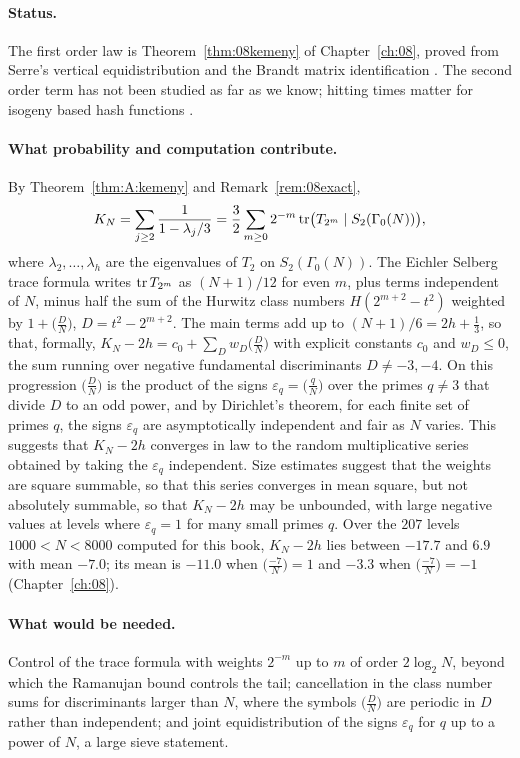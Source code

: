 \paragraph{Status.} The first order law is Theorem~\ref{thm:08kemeny} of Chapter~\ref{ch:08}, proved from Serre's vertical equidistribution \cite{serre1997} and the Brandt matrix identification \cite{pizer1990}. The second order term has not been studied as far as we know; hitting times matter for isogeny based hash functions \cite{cgl2009}.

\paragraph{What probability and computation contribute.} By Theorem~\ref{thm:A:kemeny} and Remark~\ref{rem:08exact},
\[
K_N=\sum_{j\ge2}\frac{1}{1-\lambda_j/3}=\frac32\sum_{m\ge0}2^{-m}\operatorname{tr}\bigl(T_{2^m}\mid S_2(\Gamma_0(N))\bigr),
\]
where $\lambda_2,\dots,\lambda_h$ are the eigenvalues of $T_2$ on $S_2(\Gamma_0(N))$. The Eichler Selberg trace formula writes $\operatorname{tr} T_{2^m}$ as $(N+1)/12$ for even $m$, plus terms independent of $N$, minus half the sum of the Hurwitz class numbers $H(2^{m+2}-t^2)$ weighted by $1+\bigl(\tfrac DN\bigr)$, $D=t^2-2^{m+2}$. The main terms add up to $(N+1)/6=2h+\tfrac13$, so that, formally, $K_N-2h=c_0+\sum_Dw_D\bigl(\tfrac DN\bigr)$ with explicit constants $c_0$ and $w_D\le0$, the sum running over negative fundamental discriminants $D\ne-3,-4$. On this progression $\bigl(\tfrac DN\bigr)$ is the product of the signs $\varepsilon_q=\bigl(\tfrac qN\bigr)$ over the primes $q\ne3$ that divide $D$ to an odd power, and by Dirichlet's theorem, for each finite set of primes $q$, the signs $\varepsilon_q$ are asymptotically independent and fair as $N$ varies. This suggests that $K_N-2h$ converges in law to the random multiplicative series obtained by taking the $\varepsilon_q$ independent. Size estimates suggest that the weights are square summable, so that this series converges in mean square, but not absolutely summable, so that $K_N-2h$ may be unbounded, with large negative values at levels where $\varepsilon_q=1$ for many small primes $q$. Over the $207$ levels $1000<N<8000$ computed for this book, $K_N-2h$ lies between $-17.7$ and $6.9$ with mean $-7.0$; its mean is $-11.0$ when $\bigl(\tfrac{-7}{N}\bigr)=1$ and $-3.3$ when $\bigl(\tfrac{-7}{N}\bigr)=-1$ (Chapter~\ref{ch:08}).

\paragraph{What would be needed.} Control of the trace formula with weights $2^{-m}$ up to $m$ of order $2\log_2N$, beyond which the Ramanujan bound controls the tail; cancellation in the class number sums for discriminants larger than $N$, where the symbols $\bigl(\tfrac DN\bigr)$ are periodic in $D$ rather than independent; and joint equidistribution of the signs $\varepsilon_q$ for $q$ up to a power of $N$, a large sieve statement.

